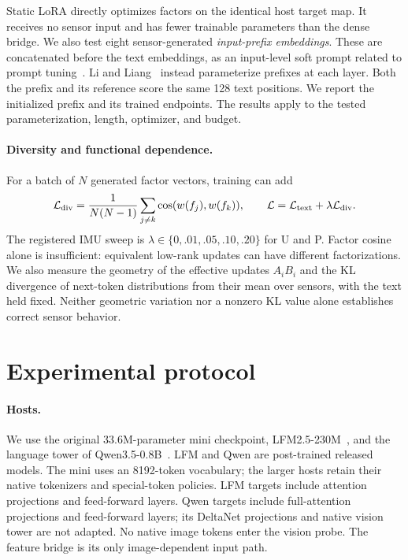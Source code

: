 \documentclass[11pt]{article}
\begin{document}
Static LoRA directly optimizes factors on the identical host target map. It
receives no sensor input and has fewer trainable parameters than the dense
bridge. We also test eight sensor-generated \emph{input-prefix embeddings}.
These are concatenated before the text embeddings, as an input-level soft
prompt related to prompt tuning~\cite{lester2021power}. Li and
Liang~\cite{li2021prefixtuning} instead parameterize prefixes at each layer.
Both the prefix and its reference score the
same 128 text positions. We report the initialized prefix and its trained
endpoints. The results apply to the tested parameterization, length, optimizer,
and budget.

\paragraph{Diversity and functional dependence.}
For a batch of $N$ generated factor vectors, training can add
\[
 \mathcal L_{\rm div}=\frac{1}{N(N-1)}\sum_{j\ne k}
 \cos(w(f_j),w(f_k)),\qquad
 \mathcal L=\mathcal L_{\rm text}+\lambda\mathcal L_{\rm div}.
\]
The registered IMU sweep is $\lambda\in\{0,.01,.05,.10,.20\}$ for U and P.
Factor cosine alone is insufficient: equivalent low-rank updates can have
different factorizations. We also measure the geometry of the effective
updates $A_iB_i$ and the KL divergence of next-token distributions from their
mean over sensors, with the text held fixed. Neither geometric variation nor a
nonzero KL value alone establishes correct sensor behavior.

\section{Experimental protocol}
\label{sec:protocol}
\paragraph{Hosts.}
We use the original 33.6M-parameter mini checkpoint,
LFM2.5-230M~\cite{liquid2026lfm}, and the language tower of
Qwen3.5-0.8B~\cite{qwen2026small}. LFM and Qwen are post-trained released
models. The mini uses an 8192-token vocabulary; the larger hosts retain their
native tokenizers and special-token policies. LFM targets include attention
projections and feed-forward layers. Qwen targets include full-attention
projections and feed-forward layers; its DeltaNet projections and native
vision tower are not adapted. No native image tokens enter the vision probe.
The feature bridge is its only image-dependent input path.
\end{document}
